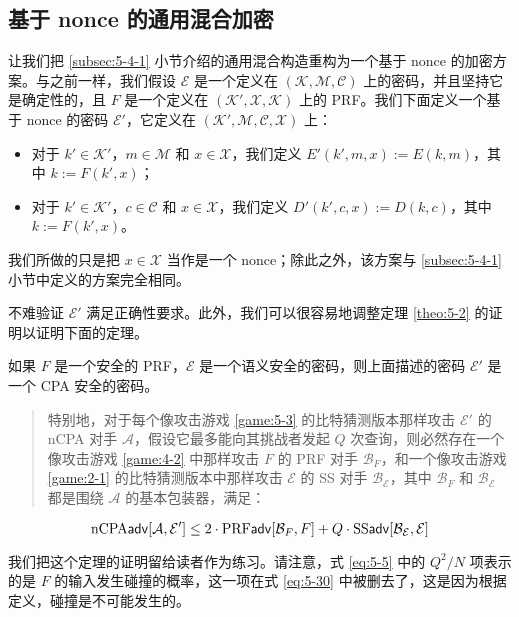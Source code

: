 \subsection{基于 nonce 的通用混合加密}

让我们把 \ref{subsec:5-4-1} 小节介绍的通用混合构造重构为一个基于 nonce 的加密方案。与之前一样，我们假设 $\mathcal{E}$ 是一个定义在 $(\mathcal{K},\mathcal{M},\mathcal{C})$ 上的密码，并且坚持它是确定性的，且 $F$ 是一个定义在 $(\mathcal{K}',\mathcal{X},\mathcal{K})$ 上的 PRF。我们下面定义一个基于 nonce 的密码 $\mathcal{E}'$，它定义在 $(\mathcal{K}',\mathcal{M},\mathcal{C},\mathcal{X})$ 上：
\begin{itemize}
	\item 对于 $k'\in\mathcal{K}'$，$m\in\mathcal{M}$ 和 $x\in\mathcal{X}$，我们定义 $E'(k',m,x):=E(k,m)$，其中 $k:=F(k',x)$；
	\item 对于 $k'\in\mathcal{K}'$，$c\in\mathcal{C}$ 和 $x\in\mathcal{X}$，我们定义 $D'(k',c,x):=D(k,c)$，其中 $k:=F(k',x)$。
\end{itemize}
我们所做的只是把 $x\in\mathcal{X}$ 当作是一个 nonce；除此之外，该方案与 \ref{subsec:5-4-1} 小节中定义的方案完全相同。

不难验证 $\mathcal{E}'$ 满足正确性要求。此外，我们可以很容易地调整定理 \ref{theo:5-2} 的证明以证明下面的定理。

\begin{theorem}\label{theo:5-5}
如果 $F$ 是一个安全的 PRF，$\mathcal{E}$ 是一个语义安全的密码，则上面描述的密码 $\mathcal{E}'$ 是一个 CPA 安全的密码。
\begin{quote}
特别地，对于每个像攻击游戏 \ref{game:5-3} 的比特猜测版本那样攻击 $\mathcal{E}'$ 的 nCPA 对手 $\mathcal{A}$，假设它最多能向其挑战者发起 $Q$ 次查询，则必然存在一个像攻击游戏 \ref{game:4-2} 中那样攻击 $F$ 的 PRF 对手 $\mathcal{B}_F$，和一个像攻击游戏 \ref{game:2-1} 的比特猜测版本中那样攻击 $\mathcal{E}$ 的 SS 对手 $\mathcal{B}_\mathcal{E}$，其中 $\mathcal{B}_F$ 和 $\mathcal{B}_\mathcal{E}$ 都是围绕 $\mathcal{A}$ 的基本包装器，满足：
\end{quote}
\begin{equation}\label{eq:5-31}
{\rm nCPA}\mathsf{adv}[\mathcal{A},\mathcal{E}']\leq
2\cdot{\rm PRF}\mathsf{adv}[\mathcal{B}_F,F]+Q\cdot{\rm SS}\mathsf{adv}[\mathcal{B}_\mathcal{E},\mathcal{E}]
\end{equation}
\end{theorem}

我们把这个定理的证明留给读者作为练习。请注意，式 \ref{eq:5-5} 中的 ${Q^2}/{N}$ 项表示的是 $F$ 的输入发生碰撞的概率，这一项在式 \ref{eq:5-30} 中被删去了，这是因为根据定义，碰撞是不可能发生的。

